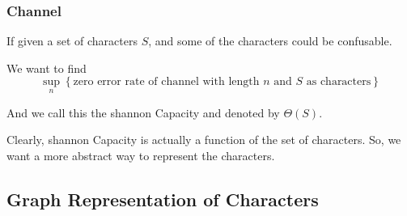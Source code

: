 \documentclass{beamer}
\begin{document}
                  \begin{frame}
                        \frametitle{Channel}
                        If given a set of characters $S$, and some of the characters could be confusable.

                        We want to find
                        \begin{equation}
                              \sup_{n} \left\{
                                    \text{zero error rate of channel with length $n$ and $S$ as characters}
                              \right\}
                        \end{equation}

                        And we call this the shannon Capacity and denoted by $\Theta(S)$.

                        Clearly, shannon Capacity is actually a function of the set of characters. So, we want a more abstract way to represent the characters.
                  \end{frame}

            \subsection{Graph Representation of Characters}
\end{document}
